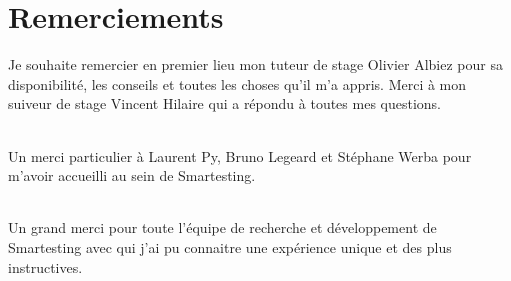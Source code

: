 \chapter*{Remerciements}

Je souhaite remercier en premier lieu mon tuteur de stage Olivier Albiez pour sa disponibilité, les conseils et toutes les choses qu'il m'a appris. Merci à mon suiveur de stage Vincent Hilaire qui a répondu à toutes mes questions.

\subparagraph*{}
Un merci particulier à Laurent Py, Bruno Legeard et Stéphane Werba pour m'avoir accueilli au sein de Smartesting.

\subparagraph*{}
Un grand merci pour toute l'équipe de recherche et développement de Smartesting avec qui j'ai pu connaitre une expérience unique et des plus instructives.

